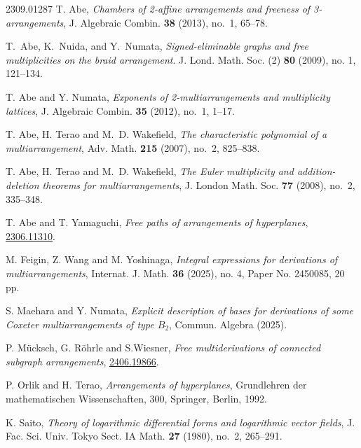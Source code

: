 \documentclass[12pt]{amsart}
\theoremstyle{definition}
\theoremstyle{remark}
\begin{document}

\newcommand{\etalchar}[1]{$^{#1}$}
\providecommand{\bysame}{\leavevmode\hbox to3em{\hrulefill}\thinspace}
\providecommand{\MR}{\relax\ifhmode\unskip\space\fi MR }
\begin{thebibliography}{2309.01287}
T. Abe, {\it Chambers of 2-affine arrangements and freeness of 3-arrangements}, J. Algebraic Combin. {\bf 38} (2013), no.~1, 65--78.

	T.~Abe, K.~Nuida, and Y.~Numata, 
	{\it Signed-eliminable graphs and free multiplicities on the
		braid arrangement}. 
	J. Lond. Math. Soc. (2) \textbf{80} (2009), no. 1, 121–134.
    
T. Abe and Y. Numata, {\it Exponents of 2-multiarrangements and multiplicity lattices}, J. Algebraic Combin. {\bf 35} (2012), no.~1, 1--17.

T. Abe, H. Terao and M.~D. Wakefield, {\it The characteristic polynomial of a multiarrangement}, Adv. Math. {\bf 215} (2007), no.~2, 825--838.

T. Abe, H. Terao and M.~D. Wakefield, {\it The {E}uler multiplicity and addition-deletion theorems for multiarrangements}, J. London Math. Soc. {\bf 77} (2008), no.~2, 335--348.

T. Abe and T. Yamaguchi, {\it Free paths of arrangements of hyperplanes}, \href{https://arxiv.org/abs/2306.11310}{2306.11310}.

M. Feigin, Z. Wang and M. Yoshinaga, {\it Integral expressions for derivations of multiarrangements}, Internat. J. Math. \textbf{36} (2025), no. 4, Paper No. 2450085, 20 pp.

S. Maehara and Y. Numata, {\it Explicit description of bases for derivations of some Coxeter multiarrangements of type $B_2$}, Commun. Algebra (2025). 

P. Mücksch, G. Röhrle and S.Wiesner, {\it Free multiderivations of connected subgraph arrangements}, \href{https://arxiv.org/abs/2406.19866}{2406.19866}.

P. Orlik and H. Terao, {\it Arrangements of hyperplanes}, Grundlehren der mathematischen Wissenschaften, 300, Springer, Berlin, 1992.

K. Saito, {\it Theory of logarithmic differential forms and logarithmic vector fields}, J. Fac. Sci. Univ. Tokyo Sect. IA Math. {\bf 27} (1980), no.~2, 265--291.


\end{thebibliography}
\end{document}
